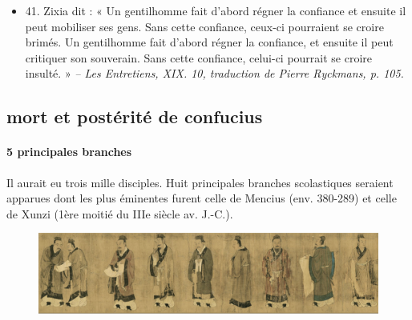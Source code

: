\begin{itemize}
\item 41. \newline Zixia dit : « Un gentilhomme fait d’abord régner la confiance et ensuite il peut mobiliser ses gens. Sans cette confiance, ceux-ci pourraient se croire brimés. Un gentilhomme fait d’abord régner la confiance, et ensuite il peut critiquer son souverain. Sans cette confiance, celui-ci pourrait se croire insulté. » \textit{\small -- Les Entretiens, XIX. 10, traduction de Pierre Ryckmans, p. 105. }

 
\end{itemize}

\subsection{mort et postérité de confucius}
\paragraph{5 principales branches}
Il aurait eu trois mille disciples. Huit principales branches scolastiques  seraient apparues dont les plus éminentes furent celle de Mencius (env. 380-289) et celle de Xunzi (1ère moitié du IIIe siècle av. J.-C.).

\begin{figure}[!h]
    \centering
    \includegraphics[width=\textwidth]{ConfucianismeTaoismeBouddhismeChinois/Images/disciplesConfucius.png}

    \label{fig:enter-label}
\end{figure}

